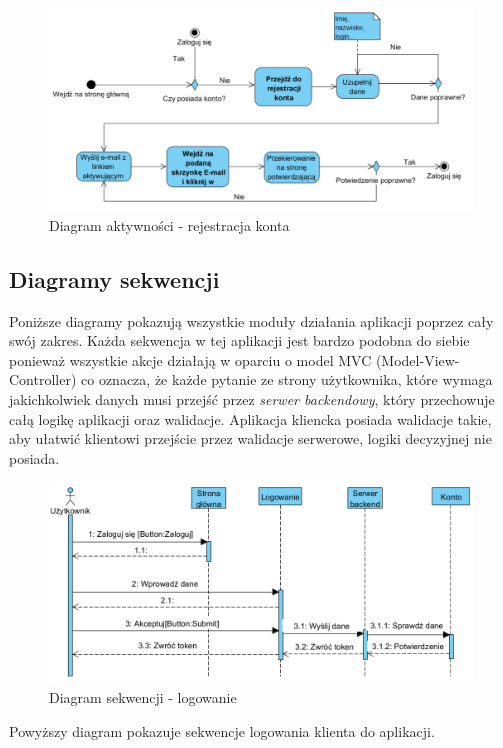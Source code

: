 \documentclass[10pt,titlepage]{article} %
\begin{document}
\begin{figure}[H]
\includegraphics[width=\textwidth]{img/sekcja2/rejestracjaKontaAD}
\caption[Diagram aktywności - rejestracja konta]{Diagram aktywności - rejestracja konta}
\end{figure}
\newpage
\subsection{Diagramy sekwencji}
Poniższe diagramy pokazują wszystkie moduły działania aplikacji poprzez cały swój zakres. Każda sekwencja w tej aplikacji jest bardzo podobna do siebie ponieważ wszystkie akcje działają w oparciu o model MVC (Model-View-Controller) co oznacza, że każde pytanie ze strony użytkownika, które wymaga jakichkolwiek danych musi przejść przez \textit{serwer backendowy}, który przechowuje całą logikę aplikacji oraz walidacje. Aplikacja kliencka posiada walidacje takie, aby ułatwić klientowi przejście przez walidacje serwerowe, logiki decyzyjnej nie posiada.

\begin{figure}[H]
\includegraphics[width=\textwidth]{img/sekcja2/logowanieSD}
\caption[Diagram sekwencji - logowanie]{Diagram sekwencji - logowanie}
\end{figure}
Powyższy diagram pokazuje sekwencje logowania klienta do aplikacji.
\end{document}
